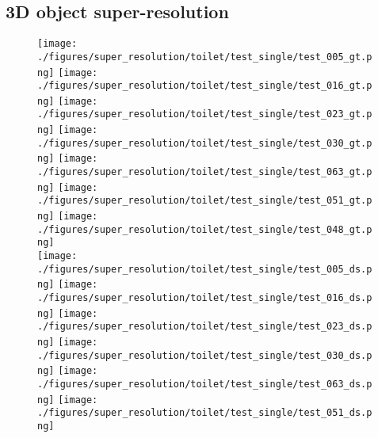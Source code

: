 \documentclass[10pt,twocolumn,letterpaper]{article}
\begin{document}
\subsection{3D object super-resolution}

\begin{figure}
	\centering
	\texttt{[image: ./figures/super\_resolution/toilet/test\_single/test\_005\_gt.png]}\hspace{-1.8mm}
	\texttt{[image: ./figures/super\_resolution/toilet/test\_single/test\_016\_gt.png]}\hspace{-1.1mm}
	\texttt{[image: ./figures/super\_resolution/toilet/test\_single/test\_023\_gt.png]}\hspace{-1.8mm}
	\texttt{[image: ./figures/super\_resolution/toilet/test\_single/test\_030\_gt.png]}\hspace{-1.8mm}
	\texttt{[image: ./figures/super\_resolution/toilet/test\_single/test\_063\_gt.png]}\hspace{-1.8mm}
	\texttt{[image: ./figures/super\_resolution/toilet/test\_single/test\_051\_gt.png]}\hspace{-2.2mm}
	\texttt{[image: ./figures/super\_resolution/toilet/test\_single/test\_048\_gt.png]}
	\\
	\texttt{[image: ./figures/super\_resolution/toilet/test\_single/test\_005\_ds.png]}\hspace{-1.4mm}
    \texttt{[image: ./figures/super\_resolution/toilet/test\_single/test\_016\_ds.png]}\hspace{-.4mm}
    \texttt{[image: ./figures/super\_resolution/toilet/test\_single/test\_023\_ds.png]}\hspace{-2.5mm}
    \texttt{[image: ./figures/super\_resolution/toilet/test\_single/test\_030\_ds.png]}	\hspace{-2.9mm}
    \texttt{[image: ./figures/super\_resolution/toilet/test\_single/test\_063\_ds.png]}	\hspace{-2.5mm}
    \texttt{[image: ./figures/super\_resolution/toilet/test\_single/test\_051\_ds.png]}	\hspace{-2.5mm}

\end{figure}
\end{document}
